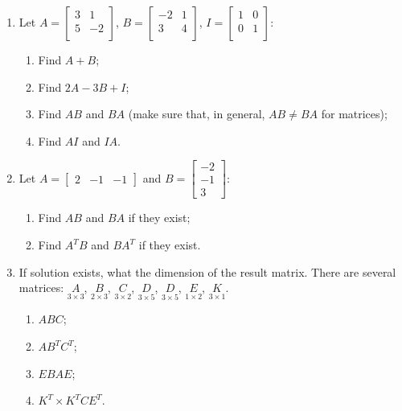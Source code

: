 \documentclass[a4paper,10pt]{article}
\begin{document}
\begin{enumerate}
\item Let $A=\begin{bmatrix} 3 & 1 \\ 5 & -2 \\ \end{bmatrix}$, $B=\begin{bmatrix} -2 & 1 \\ 3 & 4 \\ \end{bmatrix}$, $I=\begin{bmatrix} 1 & 0 \\ 0 & 1 \\ \end{bmatrix}$:
\begin{enumerate}
    \item Find $A+B$;
    \item Find $2A-3B+I$;
    \item Find $AB$ and $BA$ (make sure that, in general, $AB \neq BA$ for matrices);
    \item Find $AI$ and $IA$.
\end{enumerate}

\item Let $A=\begin{bmatrix} 2 & -1 & -1\end{bmatrix}$ and $B=\begin{bmatrix} -2 \\ -1 \\ 3 \end{bmatrix}$:
\begin{enumerate}
    \item Find $AB$ and $BA$ if they exist;
    \item Find $A^TB$ and $BA^T$ if they exist.
\end{enumerate}

\item If solution exists, what the dimension of the result matrix. There are several matrices:  $\underset{3\times3}{A}$, $\underset{2\times3}{B}$, $\underset{3\times2}{C}$, $\underset{3\times5}{D}$, $\underset{3\times5}{D}$, $\underset{1\times2}{E}$, $\underset{3\times1}{K}$.
\begin{enumerate}
    \item $ABC$;
    \item $AB^TC^T$;
    \item $EBAE$;
    \item $K^T \times K^T C E^T$.
\end{enumerate}
\end{enumerate}
\end{document}
